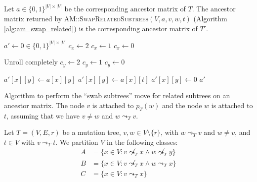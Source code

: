 \begin{theorem}
    \label{theo:swap_related_correctness}
    Let $a \in \{0,1\}^{|V| \times |V|}$ be the corresponding ancestor matrix of $T$. The ancestor matrix returned by \textsc{AM::Swap\-Related\-Subtrees}$(V, a, v, w, t)$ (Algorithm \ref{alg:am_swap_related}) is the corresponding ancestor matrix of $T'$.
\end{theorem}

\begin{algorithm}
    \begin{algorithmic}[1]
        \State $a' \leftarrow 0 \in \{0,1\}^{|V| \times |V|}$
                \State $c_x \leftarrow 2$
                \State $c_x \leftarrow 1$
            \Else
                \State $c_x \leftarrow 0$
            \EndIf

             \Comment Unroll completely
                    \State $c_y \leftarrow 2$
                    \State $c_y \leftarrow 1$
                \Else
                    \State $c_y \leftarrow 0$
                \EndIf

                    \State $a'[x][y] \leftarrow a[x][y]$
                    \State $a'[x][y] \leftarrow a[x][t]$
                \Else
                    \State $a'[x][y] \leftarrow 0$
                \EndIf
            \EndFor
        \EndFor
        \State \Return $a'$
        \EndFunction
    \end{algorithmic}
    \caption{Algorithm to perform the ``swab subtrees'' move for related subtrees on an ancestor matrix. The node $v$ is attached to $p_T(w)$ and the node $w$ is attached to $t$, assuming that we have $v \neq w$ and $w \leadsto_T v$.}
    \label{alg:am_swap_related}
\end{algorithm}

\begin{definition}
    \label{def:related_swap_classes}
    Let $T = (V, E, r)$ be a mutation tree, $v,w \in V \setminus \{r\}$, with $w \leadsto_T v$ and $w \neq v$, and $t \in V$ with $v \leadsto_T t$. We partition $V$ in the following classes:
    \begin{align*}
      A &= \{x \in V: v \not\leadsto_T x \wedge w \not\leadsto_T y\} \\
      B &= \{x \in V: v \not\leadsto_T x \wedge w \leadsto_T x\} \\
      C &= \{x \in V: v \leadsto_T x\}
    \end{align*}
\end{definition}


